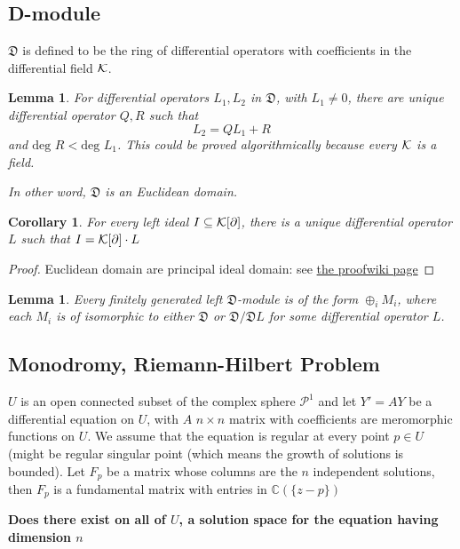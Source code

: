 \documentclass[11pt]{article}
\newtheorem{lemma}[thm]{Lemma}
\newtheorem{cor}[thm]{Corollary}
\newcommand{\pd}{\partial}
\newcommand{\cplx}{\mathbb C}
\newcommand{\frakd}{{\mathfrak D}}
\newcommand{\calk}{{\cal K}}
\begin{document}
\subsection{D-module}
$\frakd$ is defined to be the ring of differential operators with coefficients in the differential field $\calk$.
\begin{lemma}
For differential operators $L_1,L_2$ in $\frakd$, with $L_1\neq 0$, there are unique differential operator $Q,R$ such that 
$$
L_2=Q L_1+R
$$
and $\text{deg } R<\text{deg } L_1$. This could be proved algorithmically because every $\calk$ is a field.

In other word, $\frakd$ is  an Euclidean domain.
\end{lemma}
\begin{cor}
For every left ideal $I\subseteq \calk[\pd]$, there is a unique differential operator $L$ such that $I=\calk[\pd]\cdot L$
\end{cor}
\begin{proof}
Euclidean domain are principal ideal domain: see \href{https://proofwiki.org/wiki/Euclidean_Domain_is_Principal_Ideal_Domain}{the proofwiki page}
\end{proof}
\begin{lemma}
Every finitely generated left $\frakd$-module is of the form $\oplus_i M_i$, where each $M_i$ is of isomorphic to either $\frakd$ or $\frakd/\frakd L$ for some differential operator $L$.
\end{lemma}
\subsection{Monodromy, Riemann-Hilbert Problem}
$U$ is an open connected subset of the complex sphere $\mathcal{P}^1$ and let $Y'=AY$ be a differential equation on $U$, with $ A$ $n\times n$ matrix with coefficients are meromorphic functions on $U$. We assume that the equation is regular at every point $p\in U$ (might be regular singular point (which means the growth of solutions is bounded). Let $F_p$ be a matrix whose columns are the $n$ independent solutions, then $F_p$ is a fundamental matrix with entries in $\cplx(\{z-p\})$

\textbf{Does there exist on all of $U$, a solution space for the equation having dimension $n$}
\end{document}
